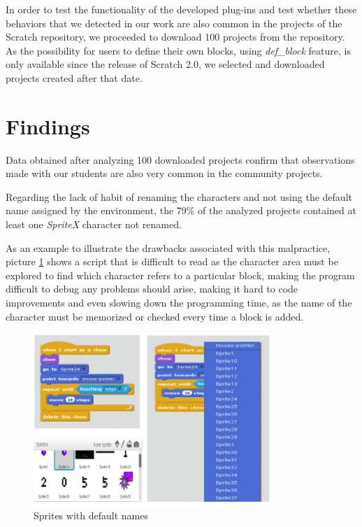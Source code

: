 \documentclass[conference]{format/IEEEtran}
\begin{document}
In order to test the functionality of the developed plug-ins and test whether these behaviors that we detected in our work are also common in the projects of the Scratch repository, we proceeded to download 100 projects from the repository. As the possibility for users to define their own blocks, using \textit{def\_block} feature, is only available since the release of Scratch 2.0, we selected and downloaded projects created after that date.


\section{Findings}
\label{sec:findings}

Data obtained after analyzing 100 downloaded projects confirm that observations made with our students are also very common in the community projects.

Regarding the lack of habit of renaming the characters and not using the default name assigned by the environment, the 79\% of the analyzed projects contained at least one \textit{SpriteX} character not renamed.

As an example to illustrate the drawbacks associated with this malpractice, picture \ref{fig:SpriteNaming} shows a script that is difficult to read as the character area must be explored to find which character refers to a particular block, making the program difficult to debug any problems should arise, making it hard to code improvements and even slowing down the programming time, as the name of the character must be memorized or checked every time a block is added. 

\begin{figure}
  \centering
    \includegraphics[width=9cm]{img/SpriteNaming.png}
  \caption{Sprites with default names}
  \label{fig:SpriteNaming}
\end{figure}
\end{document}
